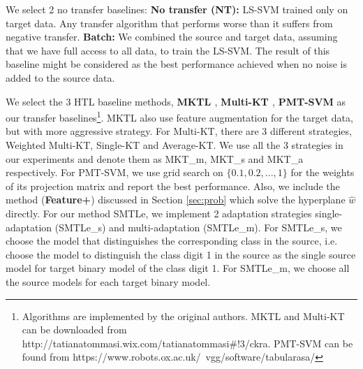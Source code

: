 We select 2 no transfer baselines:
\textbf{No transfer (NT):} LS-SVM trained only on target data. Any transfer algorithm that performs worse than it suffers from negative transfer. \textbf{Batch:} We combined the source and target data, assuming that we have full access to all data, to train the LS-SVM. The result of this baseline might be considered as the best performance achieved when no noise is added to the source data.


We select the 3 HTL baseline methods, \textbf{MKTL \cite{jie2011multiclass}}, \textbf{Multi-KT \cite{tommasi2014learning}}, \textbf{PMT-SVM} \cite{aytar2011tabula} as our transfer baselines\footnote{Algorithms are implemented by the original authors. MKTL and Multi-KT can be downloaded from http://tatianatommasi.wix.com/tatianatommasi\#!3/ckra. PMT-SVM can be found from https://www.robots.ox.ac.uk/~vgg/software/tabularasa/}. MKTL also use feature augmentation for the target data, but with more aggressive strategy. For Multi-KT, there are 3 different strategies, Weighted Multi-KT, Single-KT and Average-KT. We use all the 3 strategies in our experiments and denote them as MKT\_m, MKT\_s and MKT\_a respectively. For PMT-SVM, we use grid search on $\{0.1,0.2,...,1\}$ for the weights of its projection matrix and report the best performance.
Also, we include the method (\textbf{Feature+}) discussed in Section \ref{sec:prob} which solve the hyperplane $\hat{w}$ directly. 
For our method SMTLe, we implement 2 adaptation strategies single-adaptation (SMTLe\_s) and multi-adaptation (SMTLe\_m). For SMTLe\_s, we choose the model that distinguishes the corresponding class in the source, i.e. choose the model to distinguish the class digit 1 in the source as the single source model for target binary model of the class digit 1. For SMTLe\_m, we choose all the source models for each target binary model.





